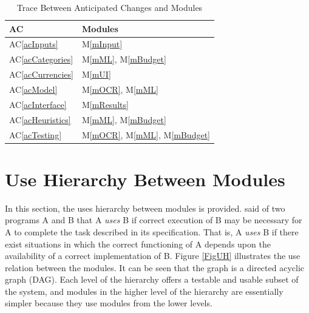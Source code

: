 \documentclass[12pt, titlepage]{article}
\newcommand{\acref}[1]{AC\ref{#1}}
\newcommand{\mref}[1]{M\ref{#1}}
\begin{document}
\begin{table}[H]
\caption{Trace Between Anticipated Changes and Modules}
\centering
\begin{tabular}{p{} p{}}
\toprule
\textbf{AC} & \textbf{Modules}\\
\midrule
\acref{acInputs} & \mref{mInput}\\
\acref{acCategories} & \mref{mML}, \mref{mBudget}\\
\acref{acCurrencies} & \mref{mUI}\\
\acref{acModel} & \mref{mOCR}, \mref{mML}\\
\acref{acInterface} & \mref{mResults}\\
\acref{acHeuristics} & \mref{mML}, \mref{mBudget}\\
\acref{acTesting} & \mref{mOCR}, \mref{mML}, \mref{mBudget}\\
\bottomrule
\end{tabular}
\label{TblACT}
\end{table}

\section{Use Hierarchy Between Modules} \label{SecUse}

In this section, the uses hierarchy between modules is
provided. \citet{Parnas1978} said of two programs A and B that A {\em uses} B if
correct execution of B may be necessary for A to complete the task described in
its specification. That is, A {\em uses} B if there exist situations in which
the correct functioning of A depends upon the availability of a correct
implementation of B.  Figure \ref{FigUH} illustrates the use relation between
the modules. It can be seen that the graph is a directed acyclic graph
(DAG). Each level of the hierarchy offers a testable and usable subset of the
system, and modules in the higher level of the hierarchy are essentially simpler
because they use modules from the lower levels.

\end{document}
